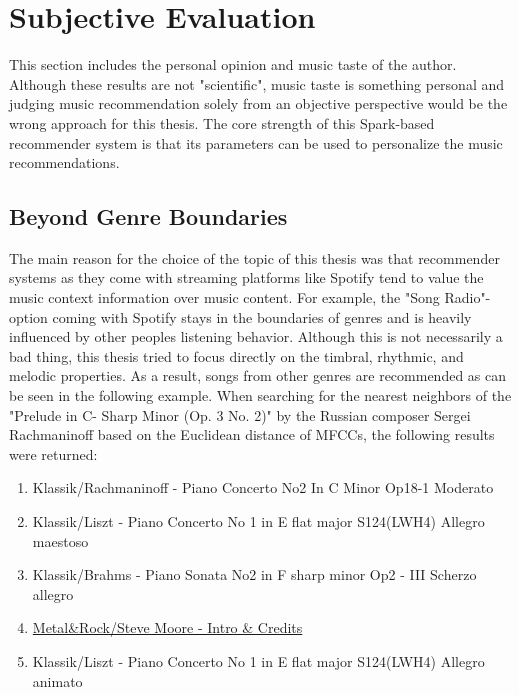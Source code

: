 \section{Subjective Evaluation}

This section includes the personal opinion and music taste of the author. Although these results are not "scientific", music taste is something personal and judging music recommendation solely from an objective perspective would be the wrong approach for this thesis. The core strength of this Spark-based recommender system is that its parameters can be used to personalize the music recommendations. 

\subsection{Beyond Genre Boundaries}

The main reason for the choice of the topic of this thesis was that recommender systems as they come with streaming platforms like Spotify tend to value the music context information over music content. For example, the "Song Radio"- option coming with Spotify stays in the boundaries of genres and is heavily influenced by other peoples listening behavior. Although this is not necessarily a bad thing, this thesis tried to focus directly on the timbral, rhythmic, and melodic properties. As a result, songs from other genres are recommended as can be seen in the following example. 
\noindent When searching for the nearest neighbors of the "Prelude in C- Sharp Minor (Op. 3 No. 2)" by the Russian composer Sergei Rachmaninoff based on the Euclidean distance of MFCCs, the following results were returned: 

\begin{enumerate}
	\setlength\itemsep{-0.5em}
	\item Klassik/Rachmaninoff - Piano Concerto No2 In C Minor Op18-1 Moderato
	\item Klassik/Liszt - Piano Concerto No 1 in E flat major S124(LWH4) Allegro maestoso
	\item Klassik/Brahms - Piano Sonata No2 in F sharp minor Op2 - III Scherzo allegro
	\item \underline{Metal\&Rock/Steve Moore - Intro \& Credits}
	\item Klassik/Liszt - Piano Concerto No 1 in E flat major S124(LWH4) Allegro animato
\end{enumerate}

